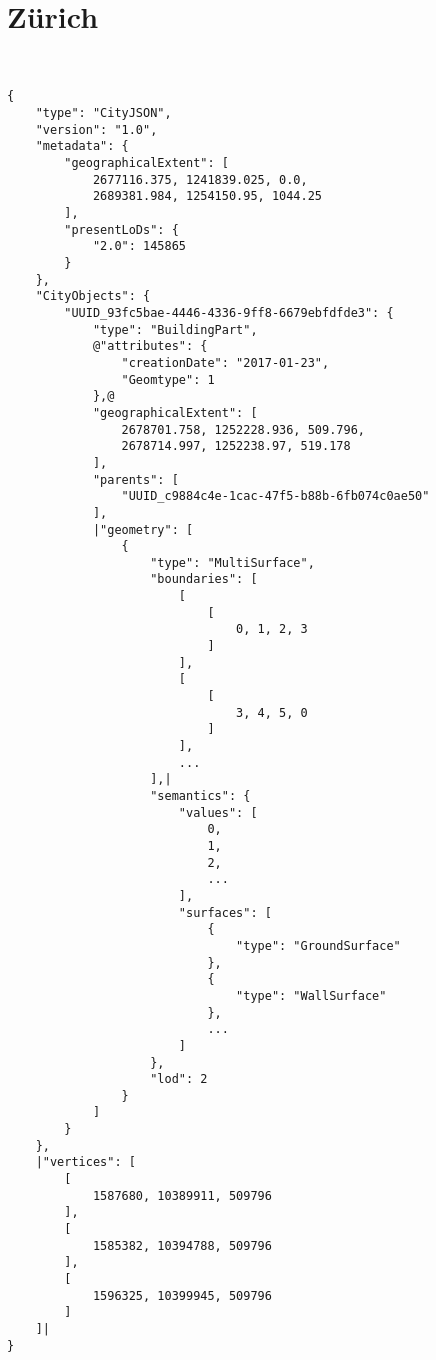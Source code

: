 \section{Zürich}


\begin{scriptsize}
\begin{minipage}[c]{\linewidth / 1}


\begin{lstlisting}[frame=single,style=base,caption={Snippet of Zurich dataset}, label=dataset:zurich]


{
    "type": "CityJSON",
    "version": "1.0",
    "metadata": {
        "geographicalExtent": [
            2677116.375, 1241839.025, 0.0,
            2689381.984, 1254150.95, 1044.25
        ],
        "presentLoDs": {
            "2.0": 145865
        }
    },
    "CityObjects": {
        "UUID_93fc5bae-4446-4336-9ff8-6679ebfdfde3": {
            "type": "BuildingPart",
            @"attributes": {
                "creationDate": "2017-01-23",
                "Geomtype": 1
            },@
            "geographicalExtent": [
                2678701.758, 1252228.936, 509.796,
                2678714.997, 1252238.97, 519.178
            ],
            "parents": [
                "UUID_c9884c4e-1cac-47f5-b88b-6fb074c0ae50"
            ],
            |"geometry": [
                {
                    "type": "MultiSurface",
                    "boundaries": [
                        [
                            [
                                0, 1, 2, 3
                            ]
                        ],
                        [
                            [
                                3, 4, 5, 0
                            ]
                        ],
                        ...
                    ],|
                    "semantics": {
                        "values": [
                            0,
                            1,
                            2,
                            ...
                        ],
                        "surfaces": [
                            {
                                "type": "GroundSurface"
                            },
                            {
                                "type": "WallSurface"
                            },
                            ...
                        ]
                    },
                    "lod": 2
                }
            ]
        }
    },
    |"vertices": [
        [
            1587680, 10389911, 509796
        ],
        [
            1585382, 10394788, 509796
        ],
        [
            1596325, 10399945, 509796
        ]
    ]|
}

\end{lstlisting}


\end{minipage}
\end{scriptsize}